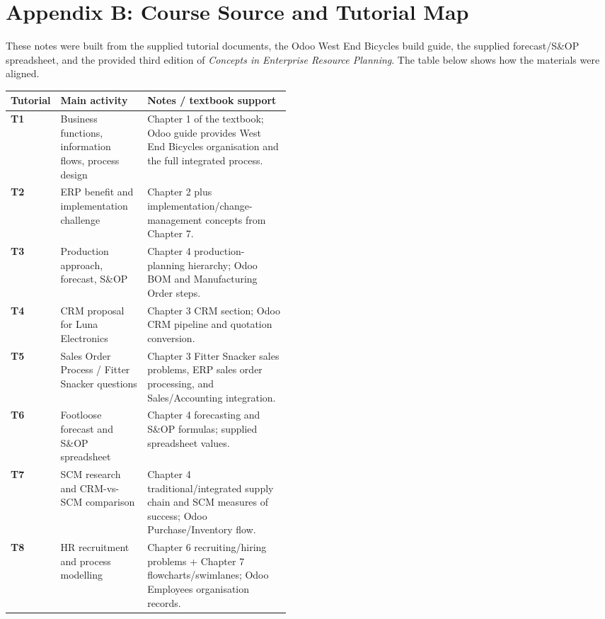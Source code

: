 \chapter*{Appendix B: Course Source and Tutorial Map}

These notes were built from the supplied tutorial documents, the Odoo West End Bicycles build guide, the supplied forecast/S\&OP spreadsheet, and the provided third edition of \emph{Concepts in Enterprise Resource Planning}. The table below shows how the materials were aligned.

\begin{erptable}
\begin{tabularx}{\linewidth}{@{}>{\bfseries\color{ERPNavy}}p{0.15\linewidth}p{0.31\linewidth}X@{}}
\toprule
\rowcolor{ERPPaleBlue!92}
Tutorial & Main activity & Notes / textbook support \\
\midrule
T1 & Business functions, information flows, process design & Chapter 1 of the textbook; Odoo guide provides West End Bicycles organisation and the full integrated process. \\
T2 & ERP benefit and implementation challenge & Chapter 2 plus implementation/change-management concepts from Chapter 7. \\
T3 & Production approach, forecast, S\&OP & Chapter 4 production-planning hierarchy; Odoo BOM and Manufacturing Order steps. \\
T4 & CRM proposal for Luna Electronics & Chapter 3 CRM section; Odoo CRM pipeline and quotation conversion. \\
T5 & Sales Order Process / Fitter Snacker questions & Chapter 3 Fitter Snacker sales problems, ERP sales order processing, and Sales/Accounting integration. \\
T6 & Footloose forecast and S\&OP spreadsheet & Chapter 4 forecasting and S\&OP formulas; supplied spreadsheet values. \\
T7 & SCM research and CRM-vs-SCM comparison & Chapter 4 traditional/integrated supply chain and SCM measures of success; Odoo Purchase/Inventory flow. \\
T8 & HR recruitment and process modelling & Chapter 6 recruiting/hiring problems + Chapter 7 flowcharts/swimlanes; Odoo Employees organisation records. \\
\bottomrule
\end{tabularx}
\end{erptable}

